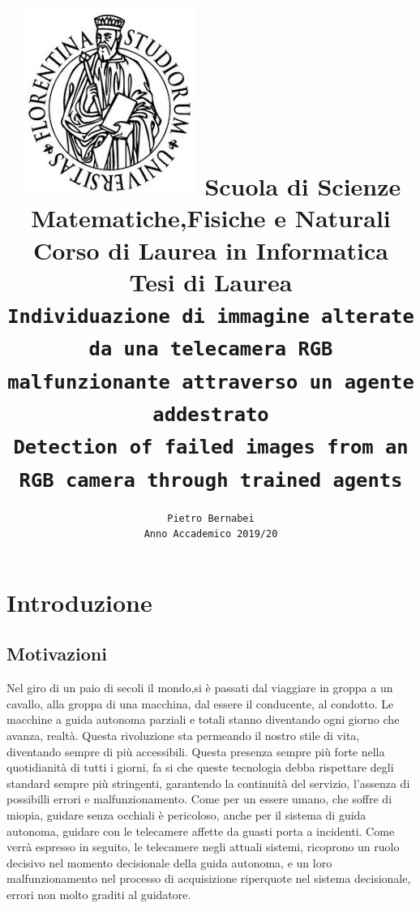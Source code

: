\documentclass[14pt]{extarticle}
\begin{document}
\title{\includegraphics[scale=0.2]{download.jpeg} \vspace{2cm} Scuola di Scienze  Matematiche,Fisiche e Naturali \\ Corso di Laurea in Informatica \\Tesi di Laurea \\ \texttt{Individuazione di immagine alterate da una telecamera RGB malfunzionante attraverso un agente addestrato}\\ \texttt{Detection of failed images from an RGB camera through trained agents}}
\author{\texttt{Pietro Bernabei} \\ \texttt{Anno Accademico 2019/20}}
\date{}
\maketitle
\newpage
\tableofcontents

\newpage
\section{Introduzione}
\subsection{Motivazioni}
Nel giro di un paio di secoli il mondo,si  è passati dal viaggiare in groppa a un cavallo, alla groppa di una macchina, dal essere il conducente, al condotto. Le macchine a guida autonoma parziali e totali stanno diventando ogni giorno che avanza, realtà. Questa rivoluzione sta permeando il nostro stile di vita, diventando sempre di più accessibili.  Questa presenza sempre più forte nella quotidianità di tutti i giorni, fa si che queste tecnologia debba rispettare degli standard sempre più stringenti, garantendo la continuità del servizio, l'assenza di possibilli errori e malfunzionamento.
Come per un essere umano, che soffre di miopia, guidare senza occhiali è pericoloso, anche per il sistema di guida autonoma, guidare con le telecamere affette da guasti porta a incidenti.
Come verrà espresso in seguito, le telecamere negli attuali sistemi, ricoprono un ruolo decisivo nel momento decisionale della guida autonoma, e un loro malfunzionamento nel processo di acquisizione riperquote nel sistema decisionale, errori non molto graditi al guidatore.
\end{document}
